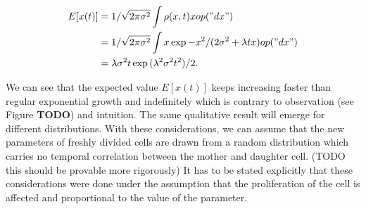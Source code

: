 \documentclass{article}
\begin{document}
\begin{align}
    E[x(t)]
    &= 1/\sqrt{2 \pi \sigma^2} \int \rho(x,t) x op("dx")\\
    &= 1/\sqrt{2 \pi \sigma^2} \int x \exp{-x^2/(2 \sigma^2} + \lambda t x) op("dx")\\
    &= \lambda \sigma^2 t \exp{(\lambda^2 \sigma^2 t^2)/2}.
\end{align}

We can see that the expected value $E[x(t)]$ keeps increasing faster than regular exponential growth
and indefinitely which is contrary to observation (see Figure \textbf{TODO}) and intuition.
The same qualitative result will emerge for different distributions.
With these considerations, we can assume that the new parameters of freshly divided cells are drawn
from a random distribution which carries no temporal correlation between the mother and daughter
cell. (TODO this should be provable more rigorously)
It has to be stated explicitly that these considerations were done under the assumption that the
proliferation of the cell is affected and proportional to the value of the parameter.
\end{document}
